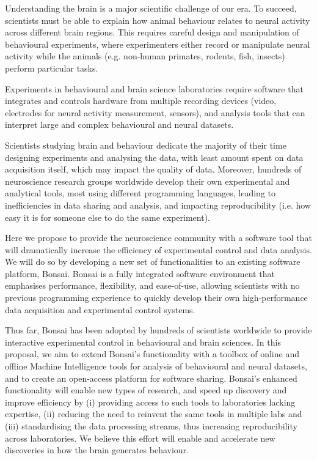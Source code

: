 Understanding the brain is a major scientific challenge of our era. To succeed, scientists must be able to explain how animal behaviour relates to neural activity across different brain regions. This requires careful design and manipulation of behavioural experiments, where experimenters either record or manipulate neural activity while the animals (e.g. non-human primates, rodents, fish, insects) perform particular tasks. 

Experiments in behavioural and brain science laboratories require software that integrates and controls hardware from multiple recording devices (video, electrodes for neural activity measurement, sensors), and analysis tools that can interpret large and complex behavioural and neural datasets. 

Scientists studying brain and behaviour dedicate the majority of their time designing experiments and analysing the data, with least amount spent on data acquisition itself, which may impact the quality of data. Moreover, hundreds of neuroscience research groups worldwide develop their own experimental and analytical tools, most using different programming languages, leading to  inefficiencies in data sharing and analysis, and impacting reproducibility (i.e. how easy it is for someone else to do the same experiment). 

Here we propose to provide the neuroscience community with a software tool that will dramatically increase the efficiency of experimental control and data analysis. We will do so by developing a new set of functionalities to an existing software platform, Bonsai. Bonsai is a fully integrated software environment that emphasises performance, flexibility, and ease-of-use, allowing scientists with no previous programming experience to quickly develop their own high-performance data acquisition and experimental control systems.

Thus far, Bonsai has been adopted by hundreds of scientists worldwide to provide interactive experimental control in behavioural and brain sciences. In this proposal, we aim to extend Bonsai’s functionality with a toolbox of online and offline Machine Intelligence tools for analysis of behavioural and neural datasets, and to create an open-access platform for software sharing. Bonsai’s enhanced functionality will enable new types of research, and speed up discovery and improve efficiency by (i) providing access to such tools to laboratories lacking expertise, (ii) reducing the need to reinvent the same tools in multiple labs and (iii) standardising the data processing streams, thus increasing reproducibility across laboratories. We believe this effort will enable and accelerate new discoveries in how the brain generates behaviour. 



